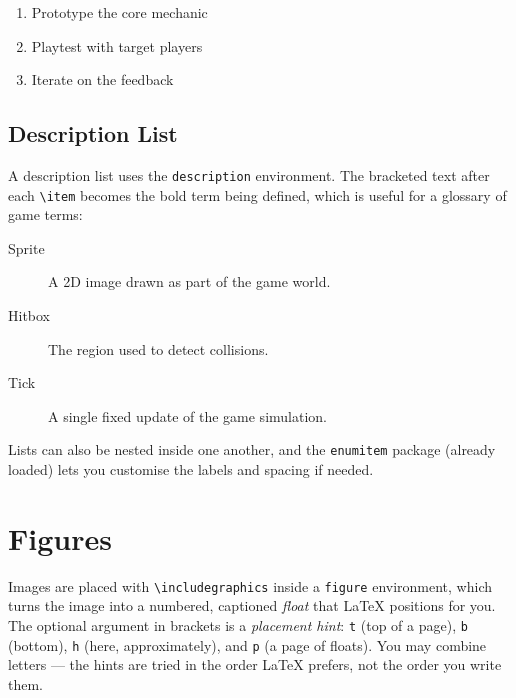 \documentclass[a4paper,twoside,twocolumn]{IEEEtran}
\begin{document}
\begin{enumerate}
    \item Prototype the core mechanic
    \item Playtest with target players
    \item Iterate on the feedback
\end{enumerate}


\subsection{Description List}

A description list uses the \texttt{description} environment. The bracketed text
after each \verb|\item| becomes the bold term being defined, which is useful for
a glossary of game terms:

\begin{description}
    \item[Sprite] A 2D image drawn as part of the game world.
    \item[Hitbox] The region used to detect collisions.
    \item[Tick] A single fixed update of the game simulation.
\end{description}

Lists can also be nested inside one another, and the \texttt{enumitem} package
(already loaded) lets you customise the labels and spacing if needed.




\section{Figures}
\label{sec:figures}

Images are placed with \verb|\includegraphics| inside a \texttt{figure}
environment, which turns the image into a numbered, captioned \emph{float} that
LaTeX positions for you. The optional argument in brackets is a \emph{placement
hint}: \verb|t| (top of a page), \verb|b| (bottom), \verb|h| (here,
approximately), and \verb|p| (a page of floats). You may combine letters --- the
hints are tried in the order LaTeX prefers, not the order you write them.
\end{document}
